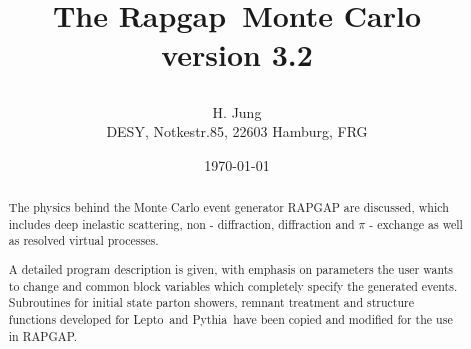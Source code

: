 \documentclass[10pt]{article} \usepackage{dina4}
\def\RAPGAP{{\sc Rapgap}}
\def\LEPTO{{\sc Lepto}}
\def\PYTHIA{{\sc Pythia}}
\begin{document}
\thispagestyle{empty}   %
\title{ \begin{center}
{\bf  The \RAPGAP\ Monte Carlo  }\\
       version 3.2  
   \end{center}}
\author{H. Jung\\
    \vspace{0.5cm} DESY, Notkestr.85, 22603 Hamburg, FRG}
\date{\today}
\maketitle
\begin{abstract}
The physics behind the Monte Carlo event generator RAPGAP are
discussed, which includes
deep inelastic scattering, non - diffraction, diffraction and 
$\pi$ - exchange as well as resolved virtual processes.
\par
A detailed program description is given, with emphasis on parameters
the user wants to change and common block variables which 
completely specify the generated events. Subroutines for initial state parton
showers, remnant treatment and structure functions developed for \LEPTO\ and
\PYTHIA\ have been copied and modified for the use in RAPGAP.
\end{abstract}
\end{document}
